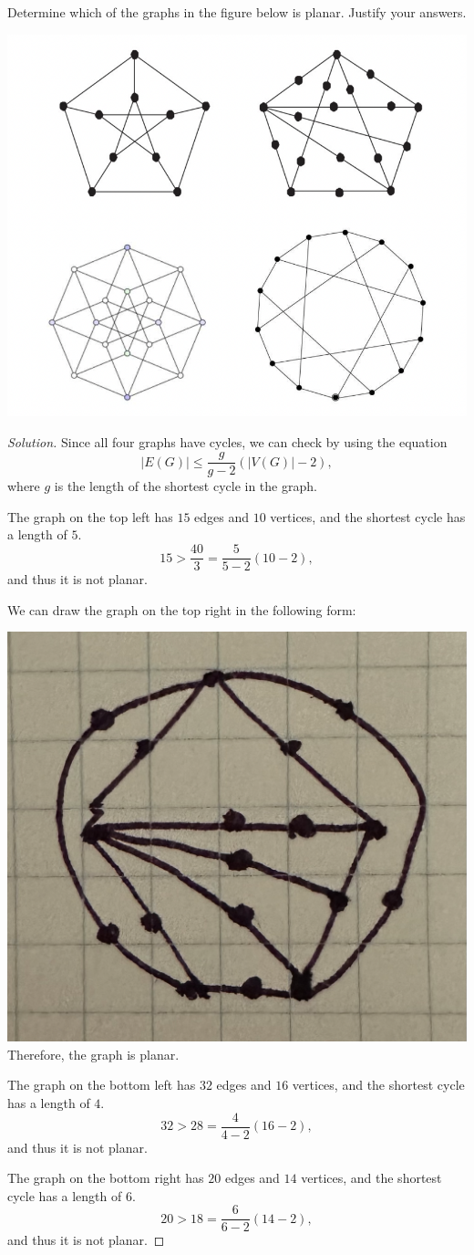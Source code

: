 \documentclass{article}
\newenvironment{problem}[2][Question]{\begin{trivlist}
\item[\hskip \labelsep {\bfseries #1}\hskip \labelsep {\bfseries #2.}]}{\end{trivlist}}
\begin{document}
\begin{problem}{4.7.5}
    Determine which of the graphs in the figure below is planar. Justify your answers.
    
    \includegraphics[width=.7\textwidth]{Q475}
\end{problem}

\begin{proof}[Solution]
    Since all four graphs have cycles, we can check by using the equation
    \[
        |E(G)| \leq \frac{g}{g - 2}(|V(G)| - 2),
    \]
    where $g$ is the length of the shortest cycle in the graph. 
    
    The graph on the top left has $15$ edges and $10$ vertices, and the shortest cycle has a length of $5$.
    \[
        15 > \frac{40}{3} = \frac{5}{5 - 2}(10 - 2),
    \]
    and thus it is not planar. 
    
    We can draw the graph on the top right in the following form:
    
    \includegraphics[width=.25\textwidth]{Q475-2} \\
    Therefore, the graph is planar.

    The graph on the bottom left has $32$ edges and $16$ vertices, and the shortest cycle has a length of $4$.
    \[
        32 > 28 = \frac{4}{4 - 2}(16 - 2),
    \]
    and thus it is not planar. 

    The graph on the bottom right has $20$ edges and $14$ vertices, and the shortest cycle has a length of $6$.
    \[
        20 > 18 = \frac{6}{6 - 2}(14 - 2),
    \]
    and thus it is not planar. 
\end{proof}
\end{document}
